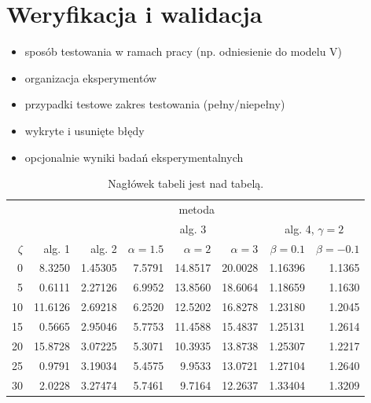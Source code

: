 \documentclass[a4paper,twoside,12pt]{book}
\begin{document}
\chapter{Weryfikacja i walidacja}
\label{ch:06}
\begin{itemize}
\item sposób testowania w ramach pracy (np. odniesienie do modelu V)
\item organizacja eksperymentów
\item przypadki testowe zakres testowania (pełny/niepełny)
\item wykryte i usunięte błędy
\item opcjonalnie wyniki badań eksperymentalnych
\end{itemize}

\begin{table}
\centering
\caption{Nagłówek tabeli jest nad tabelą.}
\label{id:tab:wyniki}
\begin{tabular}{rrrrrrrr}
\toprule
	         &                                     \multicolumn{7}{c}{metoda}                                      \\
	         \cmidrule{2-8}
	         &         &         &        \multicolumn{3}{c}{alg. 3}        & \multicolumn{2}{c}{alg. 4, $\gamma = 2$} \\
	         \cmidrule(r){4-6}\cmidrule(r){7-8}
	$\zeta$ &     alg. 1 &   alg. 2 & $\alpha= 1.5$ & $\alpha= 2$ & $\alpha= 3$ &   $\beta = 0.1$  &   $\beta = -0.1$ \\
\midrule
	       0 &  8.3250 & 1.45305 &       7.5791 &    14.8517 &    20.0028 & 1.16396 &                       1.1365 \\
	       5 &  0.6111 & 2.27126 &       6.9952 &    13.8560 &    18.6064 & 1.18659 &                       1.1630 \\
	      10 & 11.6126 & 2.69218 &       6.2520 &    12.5202 &    16.8278 & 1.23180 &                       1.2045 \\
	      15 &  0.5665 & 2.95046 &       5.7753 &    11.4588 &    15.4837 & 1.25131 &                       1.2614 \\
	      20 & 15.8728 & 3.07225 &       5.3071 &    10.3935 &    13.8738 & 1.25307 &                       1.2217 \\
	      25 &  0.9791 & 3.19034 &       5.4575 &     9.9533 &    13.0721 & 1.27104 &                       1.2640 \\
	      30 &  2.0228 & 3.27474 &       5.7461 &     9.7164 &    12.2637 & 1.33404 &                       1.3209 \\

\end{tabular}
\end{table}
\end{document}
